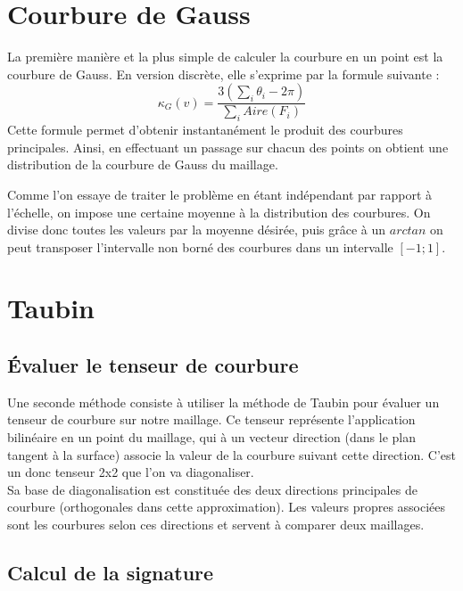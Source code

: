 \documentclass{llncs}
\begin{document}
\section{Courbure de Gauss}

La première manière et la plus simple de calculer la courbure en un point est la courbure de Gauss. En version discrète, elle s'exprime par la formule suivante :
 \[ \kappa_G(v) = \frac{3(\sum_{i}\theta_{i}-2\pi)}{\sum_{i}  Aire(F_{i})}  \]
Cette formule permet d'obtenir instantanément le produit des courbures principales. Ainsi, en effectuant un passage sur chacun des points on obtient une distribution de la courbure de Gauss du maillage. 

Comme l'on essaye de traiter le problème en étant indépendant par rapport à l'échelle, on impose une certaine moyenne à la distribution des courbures. On divise donc toutes les valeurs par la moyenne désirée, puis grâce à un $ arctan $ on peut transposer l'intervalle non borné des courbures dans un intervalle $ \left[ -1 ; 1 \right] $.

\section{Taubin}

\subsection{\'Evaluer le tenseur de courbure}
Une seconde méthode consiste à utiliser la méthode de Taubin pour évaluer un tenseur de courbure sur notre maillage. Ce tenseur représente l'application bilinéaire en un point du maillage, qui à un vecteur direction (dans le plan tangent à la surface) associe la valeur de la courbure suivant cette direction. C'est un donc tenseur 2x2 que l'on va diagonaliser.
\\
Sa base de diagonalisation est constituée des deux directions principales de courbure (orthogonales dans cette approximation). Les valeurs propres associées sont les courbures selon ces directions et servent à comparer deux maillages.


\subsection{Calcul de la signature}
\end{document}
